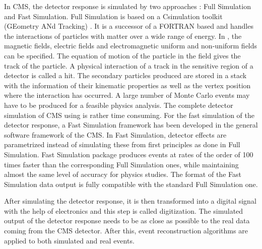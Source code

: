 In CMS, the detector response is simulated by two approaches \cite{Bayatian:2006nff} : Full Simulation and Fast Simulation. Full Simulation is based on a C\plusn\plus simulation toolkit \GEANTfour (GEometry ANd Tracking) \cite{Agostinelli:2002hh}. It is a successor of a FORTRAN based \GEANTthree and handles the interactions of particles with matter over a wide range of energy. In \GEANTfour, the magnetic fields, electric fields and electromagnetic uniform and non-uniform fields can be specified. The equation of motion of the particle in the field gives the track of the particle. A physical interaction of a track in the sensitive region of a detector is called a hit. The secondary particles produced are stored in a stack with the information of their kinematic properties as well as the vertex position where the interaction has occurred. A large number of Monte Carlo events may have to be produced for a feasible physics analysis. The complete detector simulation of CMS using \GEANTfour is rather time consuming. For the fast simulation of the detector response, a Fast Simulation framework \cite{Abdullin:2011zz} has been developed in the general software framework of the CMS. In Fast Simulation, detector effects are parametrized instead of simulating these from first principles as done in Full Simulation. Fast Simulation package produces events at rates of the order of 100 times faster than the corresponding Full Simulation ones, while maintaining almost the same level of accuracy for physics studies. The format of the Fast Simulation data output is fully compatible with the standard Full Simulation one. 

After simulating the detector response, it is then transformed into a digital signal with the help of electronics and this step is called digitization. The simulated output of the detector response needs to be as close as possible to the real data coming from the CMS detector. After this, event reconstruction algorithms are applied to both simulated and real events.
